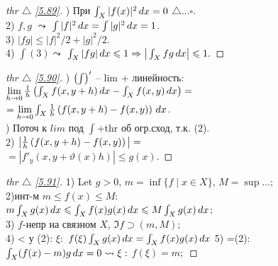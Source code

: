 
\begin{minipage}[t]{0.45\textwidth}
\begin{proof}[
{thr} $\triangle$
\eqref{5.89}]

\phantom{42}

) При $\int_X |f(x)|^2 \, d x = 0$ $\triangle \dots \square$.\\
2) $f, g$ $\leadsto$ $\int|f|^2 \, d x = \int|g|^2 \, d x = 1$. \\
3) $|fg| \leq |f|^2/2 + |g|^2/2$. \\
4) $\int (3) \leadsto$ $\int_X |fg| \, d x \leqslant 1 \Rightarrow 
\big| \int_X fg \, d x
\big| \leqslant 1.$


\end{proof}


\begin{proof}[
{thr} $\triangle$
\eqref{5.90}]

\phantom{42}

) $\left(\int\right)'$ -- lim + линейность: \\
$\lim\limits_{h \to 0} \frac{1}{h}\left(
    \int_X f(x, y + h) \, d x - \int_X f(x, y) \, d x
\right) = $ \\
$= \lim\limits_{h \to 0} \int_X \frac{1}{h} \left(f(x, y+h) - f(x, y)\right) \, d x$. \\
\small *) Поточ к $lim$ под $\int$+thr об огр.сход, т.к. (2).\\
\normalsize
2) $\big| 
\frac{1}{h} \left(f(x, y+h) - f(x, y)\right) 
\big| =$ \\
\phantom{42}
\hfill $ = |f'_y(x, y + \vartheta(x)h)| \leq g(x).$
\end{proof}


\begin{proof}[
{thr} $\triangle$
\eqref{5.91}]

\phantom{42}
\noindent

1) Let $g>0, \, m = \inf \{ f \mid x \in X \}, \, M = \sup \dots$;\\
2)инт-м $m \leq f(x) \leq M:$\\ $m \int_X g(x) \, d x \leqslant \int_X f(x) g(x) \, d x \leqslant M \int_X g(x) \, d x$;\\
3) $f$-непр на связном $X$, $\Im f \supset (m,M)$;\\
4) < у (2): $\xi:$ $f(\xi) \int_X g(x) \, d x = \int_X f(x) g(x) \, d x$
5) =(2): $\int_X (f(x)-m) g \, d x = 0 \leadsto \xi:$ $f(\xi) = m;$

\end{proof}
\end{minipage}
